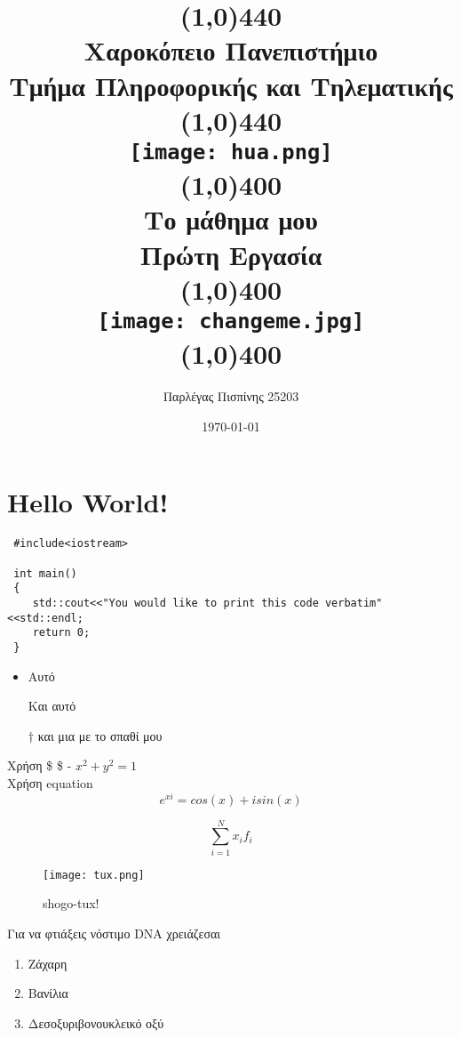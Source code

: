 \documentclass[a4paper,12pt]{report} %
\title{ %
\vspace{-3cm}%
\line(1,0){440}\\ %
Χαροκόπειο Πανεπιστήμιο\\
Τμήμα Πληροφορικής και Τηλεματικής
\vspace{0.5cm} %
\line(1,0){440}\\ %
\texttt{[image: hua.png]} \\ %
\line(1,0){400}\\
\vspace{0.2cm}
Το μάθημα μου\\
\vspace{0.2cm}
\Large{ %
Πρώτη Εργασία\\
}
\line(1,0){400}\\
\vspace{0.5cm}
\texttt{[image: changeme.jpg]}\\
\vspace{0.2cm}
\line(1,0){400}\\
}
\author{Παρλέγας Πισπίνης 25203\\%
}
\date{\today} %
\begin{document}
\color{Blue!80!Black!90!} %
\maketitle %
\section{Hello World!} %

\begin{verbatim} 
 #include<iostream>
 
 int main()
 {
    std::cout<<"You would like to print this code verbatim"<<std::endl;
    return 0;
 }
\end{verbatim}

\begin{itemize}
 \item Αυτό
 \item [\Checkmark] Και αυτό 
 \item [$\dagger$] και μια με το σπαθί μου
\end{itemize}
\vspace{2cm}
Χρήση \$ \$ - \quad
$ x^2+y^2=1 $\\

\vspace{0.3cm}
Χρήση equation \\
\begin{equation}
 e^{xi}=cos(x)+ isin(x)
\end{equation}

\begin{equation}
 \sum_{i=1}^{N} x_if_i
\end{equation}
\vspace{1cm}

\begin{figure}[h!] %
 \centering %
 \texttt{[image: tux.png]}%
 \caption{shogo-tux!} %
\end{figure}

\newpage %

Για να φτιάξεις νόστιμο DNA χρειάζεσαι
\begin{enumerate}
 \item Ζάχαρη
 \item Βανίλια
 \item Δεσοξυριβονουκλεικό οξύ
\end{enumerate}
\end{document}

